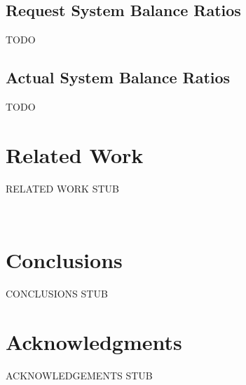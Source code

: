 \documentclass{sig-alternate}
\begin{document}
\subsection{Request System Balance Ratios}

TODO

\subsection{Actual System Balance Ratios}

TODO

\section{Related Work}

RELATED WORK STUB

~\cite{clusterdata:Di2013}

\section{Conclusions}

CONCLUSIONS STUB

\section{Acknowledgments}

ACKNOWLEDGEMENTS STUB




\end{document}
